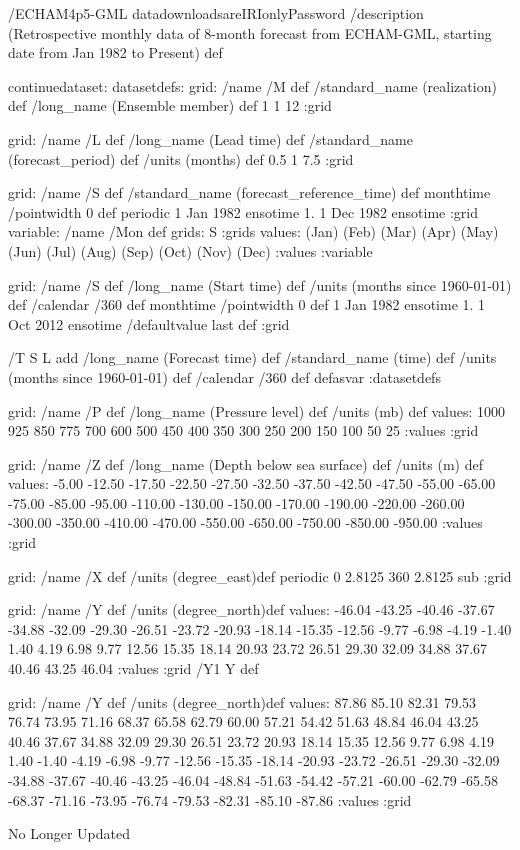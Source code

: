 \begin{ingrid}
/ECHAM4p5-GML datadownloadsareIRIonlyPassword
/description (Retrospective monthly data of 8-month forecast from ECHAM-GML, starting date from Jan 1982 to Present) def

continuedataset:
datasetdefs:
grid:
/name /M def
/standard_name (realization) def
/long_name (Ensemble member) def
1 1 12
:grid

grid:
/name /L def
/long_name (Lead time) def
/standard_name (forecast_period) def
/units (months) def
0.5 1 7.5
:grid
\end{ingrid}
grid:
/name /S def
/standard_name (forecast_reference_time) def
monthtime
/pointwidth 0 def
periodic
1 Jan 1982 ensotime
1.
1 Dec 1982 ensotime
:grid
variable:
/name /Mon def
grids: S :grids
values:
(Jan)
(Feb)
(Mar)
(Apr)
(May)
(Jun)
(Jul)
(Aug)
(Sep)
(Oct)
(Nov)
(Dec)
:values
:variable
\begin{ingrid}
grid:
/name /S def
/long_name (Start time) def
/units (months since 1960-01-01) def
/calendar /360 def
monthtime
/pointwidth 0 def 
1 Jan 1982 ensotime
1.
1 Oct 2012 ensotime
/defaultvalue {last} def
:grid

/T { 
S L add
/long_name (Forecast time) def
/standard_name (time) def
/units (months since 1960-01-01) def
/calendar /360 def
 }defasvar
:datasetdefs


grid:
/name /P def
/long_name (Pressure level) def
/units (mb) def
values: 
1000 925 850 775 700 600 500 450 400 350 300 250 200 150 100 50 25 
:values
:grid

\end{ingrid}
grid:
/name /Z def
/long_name (Depth below sea surface) def
/units (m) def
values: 
    -5.00   -12.50   -17.50   -22.50   -27.50
   -32.50   -37.50   -42.50   -47.50   -55.00
   -65.00   -75.00   -85.00   -95.00  -110.00
  -130.00  -150.00  -170.00  -190.00  -220.00
  -260.00  -300.00  -350.00  -410.00  -470.00
  -550.00  -650.00  -750.00  -850.00  -950.00
:values
:grid
\begin{ingrid}
grid:
/name /X def
/units (degree_east)def
 periodic
 0 2.8125 360  2.8125 sub
:grid
\end{ingrid}
grid:
/name /Y def
/units (degree_north)def
values:
-46.04 -43.25 -40.46
 -37.67 -34.88 -32.09 -29.30 -26.51 -23.72 -20.93 -18.14 -15.35 -12.56
 -9.77  -6.98  -4.19  -1.40   1.40   4.19   6.98   9.77  12.56  15.35
 18.14  20.93  23.72  26.51  29.30  32.09  34.88  37.67  40.46  43.25
 46.04
:values
:grid
/Y1 Y def
\begin{ingrid}
grid:
/name /Y def
/units (degree_north)def
values:
87.86 85.10 82.31 79.53 76.74 73.95 71.16 68.37
 65.58 62.79 60.00 57.21 54.42 51.63 48.84 46.04 43.25 40.46
 37.67 34.88 32.09 29.30 26.51 23.72 20.93 18.14 15.35 12.56
 9.77  6.98  4.19  1.40   -1.40   -4.19   -6.98   -9.77  -12.56  -15.35
 -18.14  -20.93  -23.72  -26.51  -29.30  -32.09  -34.88  -37.67  -40.46  -43.25
 -46.04  -48.84  -51.63  -54.42  -57.21  -60.00  -62.79  -65.58  -68.37  -71.16
 -73.95  -76.74  -79.53  -82.31  -85.10  -87.86
:values
:grid
\end{ingrid}
No Longer Updated

